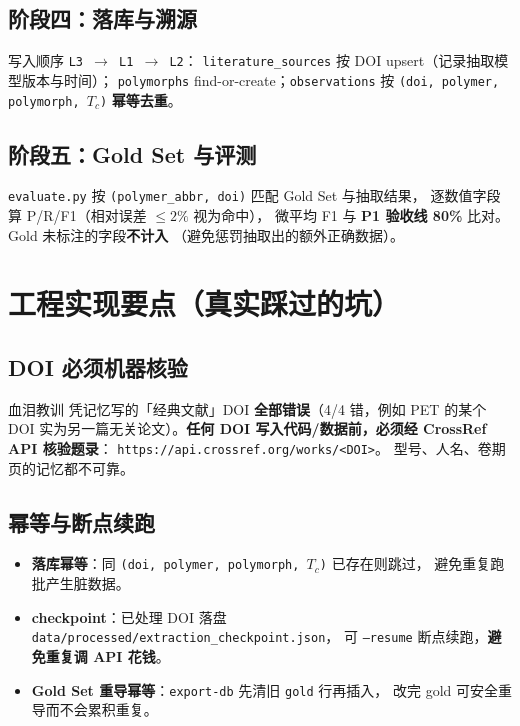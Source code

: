 \documentclass[11pt,a4paper]{ctexart}
\begin{document}
\subsection{阶段四：落库与溯源}
写入顺序 \texttt{L3 $\to$ L1 $\to$ L2}：
\texttt{literature\_sources} 按 DOI upsert（记录抽取模型版本与时间）；
\texttt{polymorphs} find-or-create；\texttt{observations} 按
\texttt{(doi, polymer, polymorph, $T_c$)} \textbf{幂等去重}。

\subsection{阶段五：Gold Set 与评测}
\texttt{evaluate.py} 按 \texttt{(polymer\_abbr, doi)} 匹配 Gold Set 与抽取结果，
逐数值字段算 P/R/F1（相对误差 $\le 2\%$ 视为命中），
微平均 F1 与 \textbf{P1 验收线 80\%} 比对。Gold 未标注的字段\textbf{不计入}
（避免惩罚抽取出的额外正确数据）。

\section{工程实现要点（真实踩过的坑）}

\subsection{DOI 必须机器核验}
\begin{warnbox}{血泪教训}
凭记忆写的「经典文献」DOI \textbf{全部错误}（4/4 错，例如 PET 的某个 DOI
实为另一篇无关论文）。\textbf{任何 DOI 写入代码/数据前，必须经 CrossRef API 核验题录}：
\texttt{https://api.crossref.org/works/<DOI>}。
型号、人名、卷期页的记忆都不可靠。
\end{warnbox}

\subsection{幂等与断点续跑}
\begin{itemize}[leftmargin=1.2em]
  \item \textbf{落库幂等}：同 \texttt{(doi, polymer, polymorph, $T_c$)} 已存在则跳过，
        避免重复跑批产生脏数据。
  \item \textbf{checkpoint}：已处理 DOI 落盘
        \texttt{data/processed/extraction\_checkpoint.json}，
        可 \texttt{--resume} 断点续跑，\textbf{避免重复调 API 花钱}。
  \item \textbf{Gold Set 重导幂等}：\texttt{export-db} 先清旧 \texttt{gold} 行再插入，
        改完 gold 可安全重导而不会累积重复。
\end{itemize}
\end{document}
